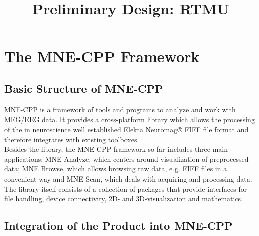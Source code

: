 





	
\title{Preliminary Design: RTMU}
\vspace{3 in}
\maketitle
\clearpage


\tableofcontents

\clearpage
\section{The MNE-CPP Framework}

\subsection{Basic Structure of MNE-CPP}

MNE-CPP is a framework of tools and programs to analyze and work with MEG/EEG data.
It provides a cross-platform library which allows the processing of the in neuroscience well established Elekta Neuromag® FIFF file format and therefore integrates with existing toolboxes. \\
Besides the library, the MNE-CPP framework so far includes three main applications: MNE Analyze, which centers around visualization of preprocessed data; MNE Browse, which allows browsing raw data, e.g. FIFF files in a convenient way and MNE Scan, which deals with acquiring and processing data. \\
The library itself consists of a collection of packages that provide interfaces for file handling, device connectivity, 2D- and 3D-visualization and mathematics.

\subsection{Integration of the Product into MNE-CPP}

